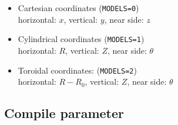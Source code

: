 \begin{itemize}
\item
Cartesian coordinates (\verb/MODELS=0/)
\\\qquad horizontal: $x$, vertical: $y$, near side: $z$
\item
Cylindrical coordinates (\verb/MODELS=1/)
\\\qquad horizontal: $R$, vertical: $Z$, near side: $\theta$
\item
Toroidal coordinates: (\verb/MODELS=2/)
\\\qquad horizontal: $R-R_0$, vertical: $Z$, near side: $\theta$
\end{itemize}


\newpage

\subsection{Compile parameter}

